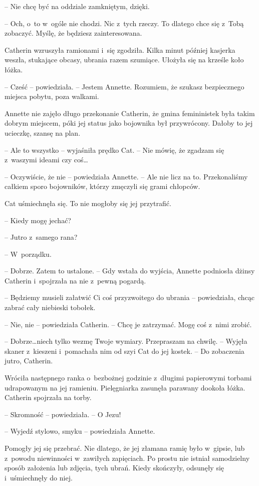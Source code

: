 \documentclass[oneside,polish,11pt,sfheadings]{mwbk}
\begin{document}
-- Nie chcę być na oddziale zamkniętym, dzięki.

-- Och, o~to w~ogóle nie chodzi. Nic z~tych rzeczy. To dlatego chce się z~Tobą zobaczyć. Myślę, że będziesz zainteresowana.

Catherin wzruszyła ramionami i~się zgodziła. Kilka minut później
kasjerka weszła, stukające obcasy, ubrania razem szumiące. Ułożyła się
na krześle koło łóżka.

-- Cześć -- powiedziała. -- Jestem Annette. Rozumiem, że szukasz
bezpiecznego miejsca pobytu, poza walkami.

Annette nie zajęło długo przekonanie Catherin, że gmina femininistek
była takim dobrym miejscem, póki jej status jako bojownika był
przywrócony. Dałoby to jej ucieczkę, szansę na plan.

-- Ale to wszystko -- wyjaśniła prędko Cat. -- Nie mówię, że zgadzam się z~waszymi ideami czy coś\ldots

-- Oczywiście, że nie -- powiedziała Annette. -- Ale nie licz na to.
Przekonaliśmy całkiem sporo bojowników, którzy zmęczyli się grami
chłopców.

Cat uśmiechnęła się. To nie mogłoby się jej przytrafić. 

-- Kiedy mogę
jechać?

-- Jutro z~samego rana?

-- W~porządku.

-- Dobrze. Zatem to ustalone. -- Gdy wstała do wyjścia, Annette podniosła
dżinsy Catherin i~spojrzała na nie z~pewną pogardą.

-- Będziemy musieli załatwić Ci coś przyzwoitego do ubrania -- powiedziała, chcąc zabrać cały niebieski tobołek.

-- Nie, nie -- powiedziała Catherin. -- Chcę je zatrzymać. Mogę coś z~nimi
zrobić.

-- Dobrze\ldots niech tylko wezmę Twoje wymiary. Przepraszam na chwilę. -- Wyjęła skaner z~kieszeni i~pomachała nim od szyi Cat do jej kostek. -- Do
zobaczenia jutro, Catherin.

Wróciła następnego ranka o~bezbożnej godzinie z~długimi papierowymi
torbami udrapowanym na jej ramieniu. Pielęgniarka zasunęła parawany
dookoła łóżka. Catherin spojrzała na torby.

-- Skromność -- powiedziała. -- O Jezu!

-- Wyjedź stylowo, smyku -- powiedziała Annette.

Pomogły jej się przebrać. Nie dlatego, że jej złamana ramię było w~gipsie, lub z~powodu niewinności w~zawiłych zapięciach. Po prostu nie
istniał samodzielny sposób założenia lub zdjęcia, tych ubrań. Kiedy
skończyły, odsunęły się i~uśmiechnęły do niej.
\end{document}
